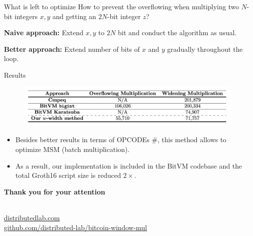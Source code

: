 \documentclass{zkdl-presentation-template}
\begin{document}
    \begin{frame}{What is left to optimize}
        How to prevent the overflowing when multiplying two $N$-bit integers
        $x,y$ and getting an $2N$-bit integer $z$?\pause

        \textcolor{blue!70!black}{\textbf{Naive approach:}} Extend $x,y$ to $2N$
        bit and conduct the algorithm as usual.\pause

        \textcolor{green!50!black}{\textbf{Better approach:}} Extend number of bits 
        of $x$ and $y$ gradually throughout the loop. 
    \end{frame}

    \begin{frame}{Results}
        \begin{figure}
            \centering
            \includegraphics[width=\linewidth]{images/results.png}
        \end{figure}
        \begin{itemize}
            \item Besides better results in terms of OPCODEs \#, this 
            method allows to optimize MSM (batch multiplication). 
            \item As a result, our implementation is included in the BitVM codebase 
            and the total Groth16 script size is reduced $2\times$.
        \end{itemize}
    \end{frame}

    \begin{frame}
        \centering
        \LARGE
        \textbf{Thank you for your attention} \\
        
        \vspace{0.2cm} \Huge {} \large \\
        
        \vspace{1cm}
  
        \href{https://distributedlab.com/}{\hspace{.325em}distributedlab.com} \\
  
        \href{https://github.com/distributed-lab/bitcoin-window-mul}{\hspace{.325em}github.com/distributed-lab/bitcoin-window-mul}
    \end{frame}
\end{document}
